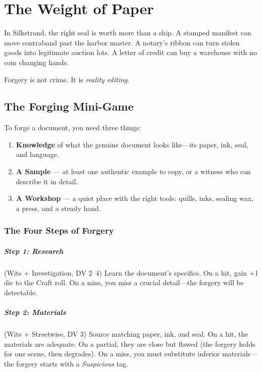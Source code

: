 \documentclass[10pt,twoside]{book}
\begin{document}
\chapter{The Weight of Paper}

In Silkstrand, the right seal is worth more than a ship. A stamped manifest can move contraband past the harbor master. A notary's ribbon can turn stolen goods into legitimate auction lots. A letter of credit can buy a warehouse with no coin changing hands.

Forgery is not crime. It is \emph{reality editing}.

\section{The Forging Mini-Game}

To forge a document, you need three things:

\begin{enumerate}
\item \textbf{Knowledge} of what the genuine document looks like---its paper, ink, seal, and language.
\item \textbf{A Sample} --- at least one authentic example to copy, or a witness who can describe it in detail.
\item \textbf{A Workshop} --- a quiet place with the right tools: quills, inks, sealing wax, a press, and a steady hand.
\end{enumerate}

\subsection{The Four Steps of Forgery}

\paragraph{Step 1: Research} (Wits + Investigation, DV 2--4)  
Learn the document's specifics. On a hit, gain +1 die to the Craft roll. On a miss, you miss a crucial detail---the forgery will be detectable.

\paragraph{Step 2: Materials} (Wits + Streetwise, DV 3)  
Source matching paper, ink, and seal. On a hit, the materials are adequate. On a partial, they are close but flawed (the forgery holds for one scene, then degrades). On a miss, you must substitute inferior materials---the forgery starts with a \textit{Suspicious} tag.
\end{document}
